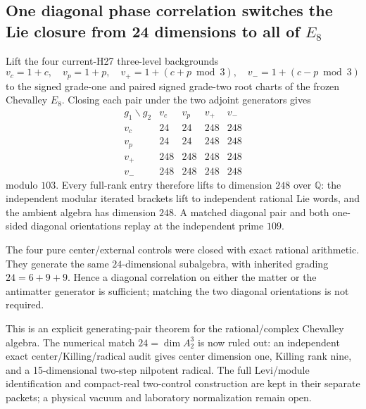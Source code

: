 \subsection*{One diagonal phase correlation switches the Lie closure from 24 dimensions to all of $E_8$}

Lift the four current-H27 three-level backgrounds
\[
v_c=1+c,\quad v_p=1+p,\quad
v_+=1+(c+p\bmod3),\quad v_-=1+(c-p\bmod3)
\]
to the signed grade-one and paired signed grade-two root charts of the frozen
Chevalley $E_8$.  Closing each pair under the two adjoint generators gives
\[
\begin{array}{c|cccc}
g_1\backslash g_2&v_c&v_p&v_+&v_-\\ \hline
v_c&24&24&248&248\\
v_p&24&24&248&248\\
v_+&248&248&248&248\\
v_-&248&248&248&248
\end{array}
\]
modulo $103$.  Every full-rank entry therefore lifts to dimension $248$ over
$\mathbb Q$: the independent modular iterated brackets lift to independent
rational Lie words, and the ambient algebra has dimension $248$.  A matched
diagonal pair and both one-sided diagonal orientations replay at the independent
prime $109$.

The four pure center/external controls were closed with exact rational
arithmetic.  They generate the same $24$-dimensional subalgebra, with inherited
grading $24=6+9+9$.  Hence a diagonal correlation on either the matter or the
antimatter generator is sufficient; matching the two diagonal orientations is
not required.

This is an explicit generating-pair theorem for the rational/complex Chevalley
algebra.  The numerical match $24=\dim A_2^3$ is now ruled out: an independent
exact center/Killing/radical audit gives center dimension one, Killing rank
nine, and a 15-dimensional two-step nilpotent radical.  The full Levi/module
identification and compact-real two-control construction are kept in their
separate packets; a physical vacuum and laboratory normalization remain open.
